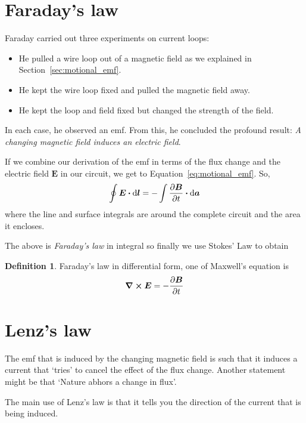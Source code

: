 \documentclass[12pt,chapterprefix=false,dvipsnames]{scrbook}
\theoremstyle{dotless}
\theoremstyle{definition}
\newtheorem{protodefinition}{Definition}[section]
\newenvironment{definition}
{\colorlet{shadecolor}{black!15}\begin{shaded}\begin{protodefinition}}
			{\end{protodefinition}\end{shaded}}
\begin{document}
\section{Faraday's law}%
\label{sec:faraday_s_law}

Faraday carried out three experiments on current loops:

\begin{itemize}
	\item He pulled a wire loop out of a magnetic field as we explained in
	      Section~\ref{sec:motional_emf}.
	\item He kept the wire loop fixed and pulled the magnetic field away.
	\item He kept the loop and field fixed but changed the strength of the
	      field.
\end{itemize}

In each case, he observed an emf. From this, he concluded the
profound result: \textit{A changing magnetic field induces an electric field}.

If we combine our derivation of the emf in terms of the flux
change and the electric field $\bm{E}$ in our
circuit, we get to Equation~\ref{eq:motional_emf}. So,
\begin{equation}
	\label{eq:faradays_law_integral}
	\oint\bm{E}\vdot\dd{\bm{l}}
	=
	-\int\pdv{\bm{B}}{t}\vdot\dd{\bm{a}}
\end{equation}
where the line and surface integrals are around the complete
circuit and the area it encloses.

The above is \textit{Faraday's law} in integral so finally we
use Stokes' Law to obtain
\begin{definition}
	Faraday's law in differential form, one of Maxwell's equation is
	\begin{equation}
		\label{eq:faradays_law_differential}
		\curl{\bm{E}} = -\pdv{\bm{B}}{t}
	\end{equation}
\end{definition}

\section{Lenz's law}%
\label{sec:lenz_s_law}

The emf that is induced by the changing magnetic field is such
that it induces a current that `tries' to cancel the effect of
the flux change. Another statement might be that `Nature abhors
a change in flux'.

The main use of Lenz's law is that it tells you the direction of
the current that is being induced.
\end{document}
